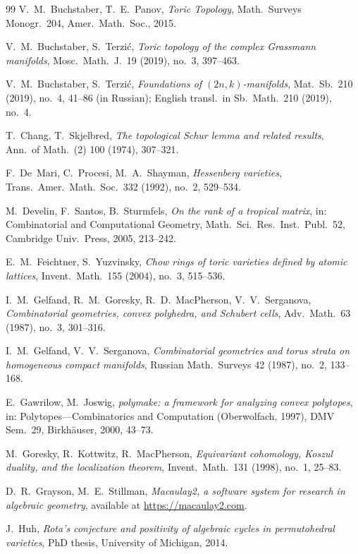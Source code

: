 \documentclass[11pt,a4paper]{article}
\numberwithin{equation}{section}
\theoremstyle{plain}
\theoremstyle{definition}
\theoremstyle{remark}
\begin{document}
\begin{thebibliography}{99}
 V.~M.~Buchstaber, T.~E.~Panov, \emph{Toric Topology}, Math.\ Surveys Monogr.\ 204, Amer.\ Math.\ Soc., 2015.

 V.~M.~Buchstaber, S.~Terzić, \emph{Toric topology of the complex Grassmann manifolds}, Mosc.\ Math.\ J.\ 19 (2019), no.~3, 397--463.

 V.~M.~Buchstaber, S.~Terzić, \emph{Foundations of $(2n,k)$-manifolds}, Mat.\ Sb.\ 210 (2019), no.~4, 41--86 (in Russian); English transl.\ in Sb.\ Math.\ 210 (2019), no.~4.

 T.~Chang, T.~Skjelbred, \emph{The topological Schur lemma and related results}, Ann.\ of Math.\ (2) 100 (1974), 307--321.

 F.~De~Mari, C.~Procesi, M.~A.~Shayman, \emph{Hessenberg varieties}, Trans.\ Amer.\ Math.\ Soc.\ 332 (1992), no.~2, 529--534.

 M.~Develin, F.~Santos, B.~Sturmfels, \emph{On the rank of a tropical matrix}, in: Combinatorial and Computational Geometry, Math.\ Sci.\ Res.\ Inst.\ Publ.\ 52, Cambridge Univ.\ Press, 2005, 213--242.

 E.~M.~Feichtner, S.~Yuzvinsky, \emph{Chow rings of toric varieties defined by atomic lattices}, Invent.\ Math.\ 155 (2004), no.~3, 515--536.

 I.~M.~Gelfand, R.~M.~Goresky, R.~D.~MacPherson, V.~V.~Serganova, \emph{Combinatorial geometries, convex polyhedra, and Schubert cells}, Adv.\ Math.\ 63 (1987), no.~3, 301--316.

 I.~M.~Gelfand, V.~V.~Serganova, \emph{Combinatorial geometries and torus strata on homogeneous compact manifolds}, Russian Math.\ Surveys 42 (1987), no.~2, 133--168.

 E.~Gawrilow, M.~Joswig, \emph{polymake: a framework for analyzing convex polytopes}, in: Polytopes---Combinatorics and Computation (Oberwolfach, 1997), DMV Sem.\ 29, Birkhäuser, 2000, 43--73.

 M.~Goresky, R.~Kottwitz, R.~MacPherson, \emph{Equivariant cohomology, Koszul duality, and the localization theorem}, Invent.\ Math.\ 131 (1998), no.~1, 25--83.

 D.~R.~Grayson, M.~E.~Stillman, \emph{Macaulay2, a software system for research in algebraic geometry}, available at \url{https://macaulay2.com}.

 J.~Huh, \emph{Rota's conjecture and positivity of algebraic cycles in permutohedral varieties}, PhD thesis, University of Michigan, 2014.


\end{thebibliography}
\end{document}
